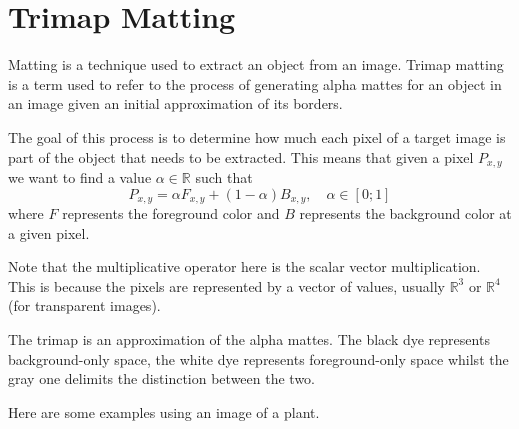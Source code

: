 \documentclass[a4paper]{article}
\begin{document}
\pagebreak

\section{Trimap Matting}

Matting is a technique used to extract an object
from an image.
Trimap matting is a term used to refer to the process
of generating alpha mattes\cite{matte} for an object
in an image given an initial
approximation of its borders.

The goal of this process is to determine
how much each pixel of a target image is part of the
object that needs to be extracted.
This means that given a pixel \(P_{x,y}\)
we want to find a value \(\alpha \in \mathbb{R}\) such that
\[
    P_{x,y} = \alpha F_{x,y} + (1-\alpha) B_{x,y},
    \quad \alpha \in [0;1]
\]
where \(F\) represents the foreground color
and \(B\) represents the background color at a given pixel.

Note that the multiplicative operator here is the scalar vector multiplication.
This is because the pixels are represented by a vector of values,
usually \({\mathbb{R}}^3\) or \({\mathbb{R}}^4\) (for transparent images).

The trimap is an approximation of the alpha mattes.
The black dye represents background-only space, the white dye
represents foreground-only space whilst the gray one
delimits the distinction between the two.

Here are some examples using an image of a plant.
\end{document}
